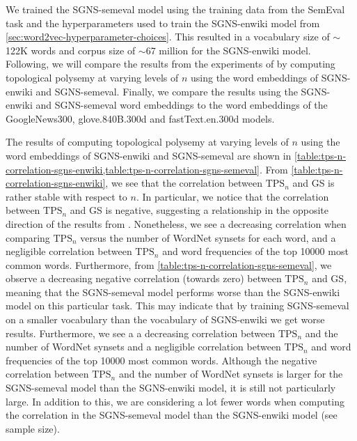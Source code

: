 We trained the SGNS-semeval model using the training data from the SemEval task and the hyperparameters used to train the SGNS-enwiki model from \cref{sec:word2vec-hyperparameter-choices}. This resulted in a vocabulary size of $\sim$122K words and corpus size of $\sim$67 million for the SGNS-enwiki model. Following, we will compare the results from the experiments of \cite{jakubowski2020topology} by computing topological polysemy at varying levels of $n$ using the word embeddings of SGNS-enwiki and SGNS-semeval. Finally, we compare the results using the SGNS-enwiki and SGNS-semeval word embeddings to the word embeddings of the GoogleNews300, glove.840B.300d and fastText.en.300d models.

The results of computing topological polysemy at varying levels of $n$ using the word embeddings of SGNS-enwiki and SGNS-semeval are shown in \cref{table:tps-n-correlation-sgns-enwiki,table:tps-n-correlation-sgns-semeval}. From \cref{table:tps-n-correlation-sgns-enwiki}, we see that the correlation between $\text{TPS}_n$ and GS is rather stable with respect to $n$. In particular, we notice that the correlation between $\text{TPS}_n$ and GS is negative, suggesting a relationship in the opposite direction of the results from \cite[Table 1]{jakubowski2020topology}. Nonetheless, we see a decreasing correlation when comparing $\text{TPS}_n$ versus the number of WordNet synsets for each word, and a negligible correlation between $\text{TPS}_n$ and word frequencies of the top 10000 most common words. Furthermore, from \cref{table:tps-n-correlation-sgns-semeval}, we observe a decreasing negative correlation (towards zero) between $\text{TPS}_n$ and GS, meaning that the SGNS-semeval model performs worse than the SGNS-enwiki model on this particular task. This may indicate that by training SGNS-semeval on a smaller vocabulary than the vocabulary of SGNS-enwiki we get worse results. Furthermore, we see a a decreasing correlation between $\text{TPS}_n$ and the number of WordNet synsets and a negligible correlation between $\text{TPS}_n$ and word frequencies of the top 10000 most common words. Although the negative correlation between $\text{TPS}_n$ and the number of WordNet synsets is larger for the SGNS-semeval model than the SGNS-enwiki model, it is still not particularly large. In addition to this, we are considering a lot fewer words when computing the correlation in the SGNS-semeval model than the SGNS-enwiki model (see sample size).
